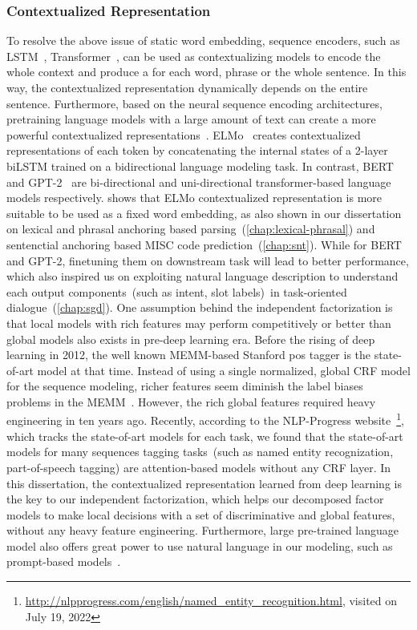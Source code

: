 \subsubsection{Contextualized Representation}
\label{sssec:bg:contextualizing}
To resolve the above issue of static word embedding, sequence encoders, such
as LSTM~\citep{hochreiter97lstm}, Transformer~\citep{NIPS2017_7181},
can be used as contextualizing models to encode the whole context and
produce a  for each word, phrase or
the whole sentence. In this way, the contextualized representation
dynamically depends on the entire sentence. Furthermore, based on the
neural sequence encoding architectures, pretraining language models
with a large amount of text can create a more powerful contextualized
representations~\citep{ethayarajh2019contextual}. ELMo~\cite{elmo}
creates contextualized representations of each token by concatenating
the internal states of a 2-layer biLSTM trained on a bidirectional
language modeling task. In contrast, BERT~\citep{devlin2019bert} and
GPT-2~\citep{radford2018improving} are bi-directional and
uni-directional transformer-based language models
respectively. \citet{peters2019tune} shows that ELMo contextualized
representation is more suitable to be used as a fixed word embedding,
as also shown in our dissertation on lexical and phrasal anchoring based
parsing~(\autoref{chap:lexical-phrasal}) and sentenctial anchoring
based MISC code prediction~(\autoref{chap:snt}). While for BERT and
GPT-2, finetuning them on downstream task will lead to better
performance, which also inspired us on exploiting natural language
description to understand each output components~(such as intent, slot
labels)~in task-oriented dialogue~(\autoref{chap:sgd}).  One
assumption behind the independent factorization is that local models
with rich features may perform competitively or better than global
models also exists in pre-deep learning era. Before the rising of deep
learning in 2012, the well known MEMM-based Stanford pos tagger is the
state-of-art model at that time. Instead of using a single normalized,
global CRF model for the sequence modeling, richer features seem
diminish the label biases problems in the
MEMM~\citep{toutanvoa2000enriching,toutanova2003feature}. However, the
rich global features required heavy engineering in ten years ago.
Recently, according to the NLP-Progress
website~\footnote{\url{http://nlpprogress.com/english/named_entity_recognition.html},
  visited on July 19, 2022}, which tracks the state-of-art models for
each task, we found that the state-of-art models for many sequences
tagging tasks~(such as named entity recognization, part-of-speech
tagging) are attention-based models without any CRF layer. In this
dissertation, the contextualized representation learned from deep learning
is the key to our independent factorization, which helps our
decomposed factor models to make local decisions with a set of
discriminative and global features, without any heavy feature
engineering. Furthermore, large pre-trained language model also offers
great power to use natural language in our modeling, such as
prompt-based models~\citep{shin2020autoprompt,liu2021pre}.

